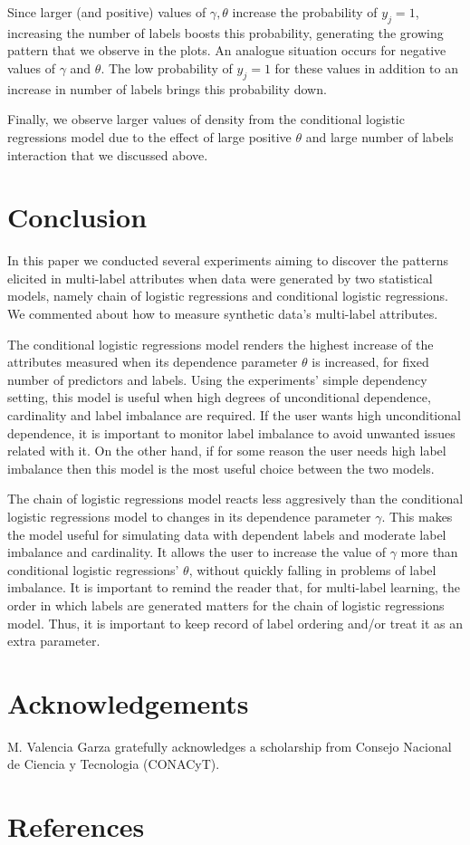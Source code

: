 \documentclass[review]{elsarticle}
\begin{document}
		Since larger (and positive) values of $\gamma, \theta$ increase the probability of $y_{j}=1$, increasing the number of labels boosts this probability, generating the growing pattern that we observe in the plots. An analogue situation occurs for negative values of $\gamma$ and $\theta$. The low probability of $y_{j}=1$ for these values in addition to an increase in number of labels brings this probability down.
		
		Finally, we observe larger values of density from the conditional logistic regressions model due to the effect of large positive $\theta$ and large number of labels interaction that we discussed above.
		
		\section{Conclusion}
		\label{CONCL} %
		
		In this paper we conducted several experiments aiming to discover the patterns elicited in multi-label attributes when data were generated by two statistical models, namely chain of logistic regressions and conditional logistic regressions. We commented about how to measure synthetic data's multi-label attributes. 
		
		The conditional logistic regressions model renders the highest increase of the attributes measured when its dependence parameter $\theta$ is increased,  for fixed number of predictors and labels. Using the experiments' simple dependency setting, this model is useful when high degrees of unconditional dependence, cardinality and label imbalance are required. If the user wants high unconditional dependence, it is important to monitor label imbalance to avoid unwanted issues related with it. On the other hand, if for some reason the user needs high label imbalance then this model is the most useful choice between the two models.
		
		The chain of logistic regressions model reacts less aggresively than the conditional logistic regressions model to changes in its dependence parameter $\gamma$. This makes the model useful for simulating data with dependent labels and moderate label imbalance and cardinality. It allows the user to increase the value of $\gamma$ more than conditional logistic regressions' $\theta$, without quickly falling in problems of label imbalance. It is important to remind the reader that, for multi-label learning, the order in which labels are generated matters for the chain of logistic regressions model. Thus, it is important to keep record of label ordering and/or treat it as an extra parameter.
		
		
		\section*{Acknowledgements}
		M. Valencia Garza gratefully acknowledges a scholarship from Consejo Nacional de Ciencia y Tecnologia (CONACyT).
		
		\section*{References}
		
		
		
		
	
\end{document}
